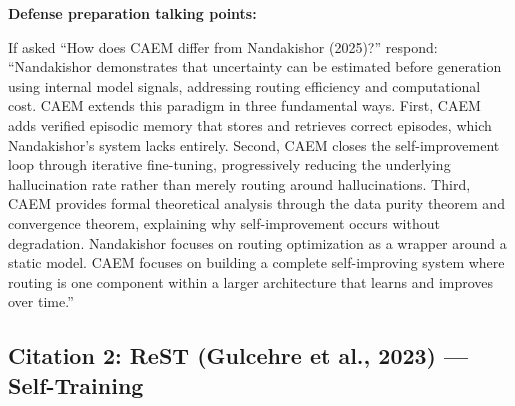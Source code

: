 \documentclass[11pt,a4paper]{article}
\begin{document}
{\textbf{Defense preparation talking points:}

If asked ``How does CAEM differ from Nandakishor (2025)?'' respond: ``Nandakishor demonstrates that uncertainty can be estimated before generation using internal model signals, addressing routing efficiency and computational cost. CAEM extends this paradigm in three fundamental ways. First, CAEM adds verified episodic memory that stores and retrieves correct episodes, which Nandakishor's system lacks entirely. Second, CAEM closes the self-improvement loop through iterative fine-tuning, progressively reducing the underlying hallucination rate rather than merely routing around hallucinations. Third, CAEM provides formal theoretical analysis through the data purity theorem and convergence theorem, explaining why self-improvement occurs without degradation. Nandakishor focuses on routing optimization as a wrapper around a static model. CAEM focuses on building a complete self-improving system where routing is one component within a larger architecture that learns and improves over time.''
}

\subsection{Citation 2: ReST (Gulcehre et al., 2023) — Self-Training}
\end{document}
